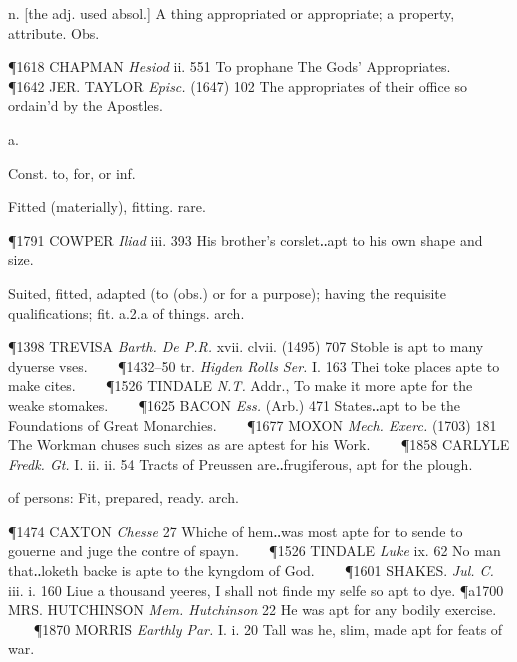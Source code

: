 \begin{description}[wide, labelwidth=!, labelindent=0pt]
\begin{myenumerate}
 n. [the adj. used absol.] A thing appropriated or appropriate; a property, attribute. Obs.

\P 1618 CHAPMAN  \textit{Hesiod} ii. 551 To prophane The Gods' Appropriates.    
\P 1642 JER. TAYLOR  \textit{Episc.} (1647) 102 The appropriates of their office so ordain'd by the Apostles.
\end{myenumerate}


 a.

\noindent {}


\noindent Const. to, for, or inf.
\vspace{-0.3cm}

\begin{myenumerate}
 Fitted (materially), fitting. rare.

\P 1791 COWPER  \textit{Iliad} iii. 393 His brother's corslet‥apt to his own shape and size.

 Suited, fitted, adapted (to (obs.) or for a purpose); having the requisite qualifications; fit. a.2.a of things. arch.

\P 1398 TREVISA  \textit{Barth. De P.R.} xvii. clvii. (1495) 707 Stoble is apt to many dyuerse vses.    
\P 1432–50 tr. \textit{Higden Rolls Ser.} I. 163 Thei toke places apte to make cites.    
\P 1526 TINDALE  \textit{N.T.} Addr., To make it more apte for the weake stomakes.    
\P 1625 BACON  \textit{Ess.} (Arb.) 471 States‥apt to be the Foundations of Great Monarchies.    
\P 1677 MOXON  \textit{Mech. Exerc.} (1703) 181 The Workman chuses such sizes as are aptest for his Work.    
\P 1858 CARLYLE  \textit{Fredk. Gt.} I. ii. ii. 54 Tracts of Preussen are‥frugiferous, apt for the plough.

 of persons: Fit, prepared, ready. arch.

\P 1474 CAXTON  \textit{Chesse} 27 Whiche of hem‥was most apte for to sende to gouerne and juge the contre of spayn.    
\P 1526 TINDALE  \textit{Luke} ix. 62 No man that‥loketh backe is apte to the kyngdom of God.    
\P 1601 SHAKES.  \textit{Jul. C.} iii. i. 160 Liue a thousand yeeres, I shall not finde my selfe so apt to dye.
\P a1700 MRS. HUTCHINSON  \textit{Mem. Hutchinson} 22 He was apt for any bodily exercise.    
\P 1870 MORRIS  \textit{Earthly Par.} I. i. 20 Tall was he, slim, made apt for feats of war.


\end{myenumerate}
\end{description}
